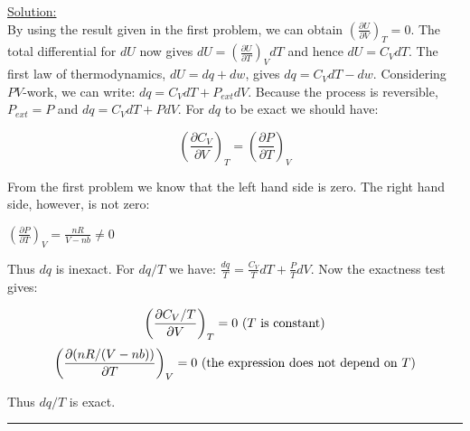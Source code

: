 \noindent
\underline{Solution:}\\

By using the result given in the first problem, we can obtain $\left(\frac{\partial U}{\partial V}\right)_T = 0$. The total differential for $dU$ now gives $dU = \left(\frac{\partial U}{\partial T}\right)_VdT$ and hence $dU = C_VdT$. The first law of thermodynamics, $dU = dq + dw$, gives $dq = C_VdT - dw$. Considering $PV$-work, we can write: $dq = C_VdT + P_{ext}dV$. Because the process is reversible, $P_{ext} = P$ and $dq = C_VdT + PdV$. For $dq$ to be exact we should have:

$$\left(\frac{\partial C_V}{\partial V}\right)_T = \left(\frac{\partial P}{\partial T}\right)_V$$

From the first problem we know that the left hand side is zero. The right hand side, however, is not zero:

$\left(\frac{\partial P}{\partial T}\right)_V = \frac{nR}{V - nb} \ne 0$

Thus $dq$ is inexact. For $dq / T$ we have: $\frac{dq}{T} = \frac{C_V}{T}dT + \frac{P}{T}dV$. Now the exactness test gives:

$$\left(\frac{\partial C_V / T}{\partial V}\right)_T = 0\textnormal{ (}T\textnormal{ is constant)}$$
$$\left(\frac{\partial (nR / (V - nb))}{\partial T}\right)_V = 0\textnormal{ (the expression does not depend on }T\textnormal{)}$$

Thus $dq/T$ is exact.

\hrule\vspace{0.5cm}
